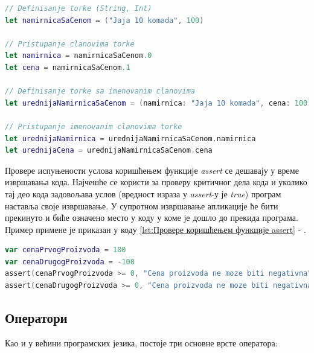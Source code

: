 \documentclass[12pt,oneside]{memoir}
\begin{document}
\begin{lstlisting}[caption=\textit{{Торка}}, label={lst:Торка}, language=Swift, frame=single]
// Definisanje torke (String, Int)
let namirnicaSaCenom = ("Jaja 10 komada", 100)

// Pristupanje clanovima torke
let namirnica = namirnicaSaCenom.0
let cena = namirnicaSaCenom.1

// Definisanje torke sa imenovanim clanovima
let urednijaNamirnicaSaCenom = (namirnica: "Jaja 10 komada", cena: 100)

// Pristupanje imenovanim clanovima torke
let urednijaNamirnica = urednijaNamirnicaSaCenom.namirnica
let urednijaCena = urednijaNamirnicaSaCenom.cena
\end{lstlisting}

\indent Провере испуњености услова коришћењем функције \textit{assert} се дешавају у време извршавања кода. Најчешће се користи за проверу критичног дела кода и уколико тај део кода задовољава услов (вредност израза у \textit{assert}-у је \textit{true}) програм наставља своје извршавање. У супротном извршавање апликације ће бити прекинуто и биће означено место у коду у коме је дошло до прекида програма. Пример примене је приказан у коду \ref{lst:Провере коришћењем функције assert} - .

\begin{lstlisting}[caption=\textit{{Провере коришћењем функције assert}}, label={lst:Провере коришћењем функције assert}, language=Swift, frame=single]
var cenaPrvogProizvoda = 100
var cenaDrugogProizvoda = -100
assert(cenaPrvogProizvoda >= 0, "Cena proizvoda ne moze biti negativna") //true
assert(cenaDrugogProizvoda >= 0, "Cena proizvoda ne moze biti negativna") //false
\end{lstlisting}

\subsection{Оператори}

\indent Као и у већини програмских језика, постоје три основне врсте оператора: 
\end{document}
